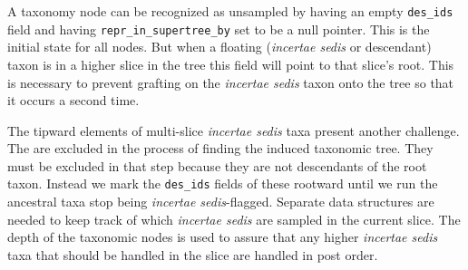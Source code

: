 \documentclass[english]{article}
\newcommand{\incsed}[0]{{\em incertae sedis}\xspace}
\begin{document}
A taxonomy node can be recognized as unsampled by having an empty \texttt{des\_ids}
    field and having \texttt{repr\_in\_supertree\_by} set to be a null pointer.
This is the initial state for all nodes.
But when a floating (\incsed or descendant) taxon is in a higher slice in the tree
    this field will point to that slice's root.
This is necessary to prevent grafting on the \incsed taxon onto the tree so that it
    occurs a second time.

The tipward elements of multi-slice \incsed taxa present another challenge.
The are excluded in the process of finding the induced taxonomic tree.
They must be excluded in that step because they are not descendants of the root taxon.
Instead we mark the \texttt{des\_ids} fields of these rootward until
    we run the ancestral taxa stop being \incsed-flagged.
Separate data structures are needed to keep track of which \incsed are sampled
    in the current slice.
The depth of the taxonomic nodes is used to assure that any higher \incsed taxa
    that should be handled in the slice are handled in post order.
\end{document}
